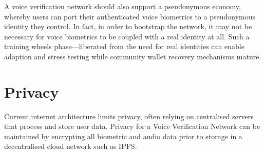 \documentclass[11pt,a4paper]{article}
\begin{document}
A voice verification network should also support a pseudonymous economy, whereby users can port their authenticated voice biometrics to a pseudonymous identity they control.
In fact, in order to bootstrap the network, it may not be necessary for voice biometrics to be coupled with a real identity at all.
Such a \textquotesingle training wheels\textquotesingle{} phase---liberated from the need for real identities can enable adoption and stress testing while community wallet recovery mechanisms mature.

\section{Privacy}
\label{sec:results}
Current internet architecture limits privacy, often relying on centralised servers that process and store user data.
Privacy for a Voice Verification Network can be maintained by encrypting all biometric and audio data prior to storage in a decentralised cloud network such as IPFS.
\end{document}

